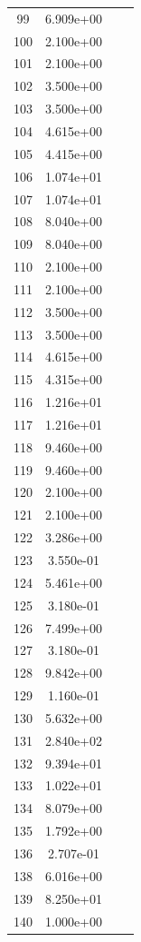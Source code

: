 \documentclass[12pt]{article}
\begin{document}
\begin{longtable}{@{}cccc@{}}
99 & 6.909e+00 &  &  \\
100 & 2.100e+00 &  &  \\
101 & 2.100e+00 &  &  \\
102 & 3.500e+00 &  &  \\
103 & 3.500e+00 &  &  \\
104 & 4.615e+00 &  &  \\
105 & 4.415e+00 &  &  \\
106 & 1.074e+01 &  &  \\
107 & 1.074e+01 &  &  \\
108 & 8.040e+00 &  &  \\
109 & 8.040e+00 &  &  \\
110 & 2.100e+00 &  &  \\
111 & 2.100e+00 &  &  \\
112 & 3.500e+00 &  &  \\
113 & 3.500e+00 &  &  \\
114 & 4.615e+00 &  &  \\
115 & 4.315e+00 &  &  \\
116 & 1.216e+01 &  &  \\
117 & 1.216e+01 &  &  \\
118 & 9.460e+00 &  &  \\
119 & 9.460e+00 &  &  \\
120 & 2.100e+00 &  &  \\
121 & 2.100e+00 &  &  \\
122 & 3.286e+00 &  &  \\
123 & 3.550e-01 &  &  \\
124 & 5.461e+00 &  &  \\
125 & 3.180e-01 &  &  \\
126 & 7.499e+00 &  &  \\
127 & 3.180e-01 &  &  \\
128 & 9.842e+00 &  &  \\
129 & 1.160e-01 &  &  \\
130 & 5.632e+00 &  &  \\
131 & 2.840e+02 &  &  \\
132 & 9.394e+01 &  &  \\
133 & 1.022e+01 &  &  \\
134 & 8.079e+00 &  &  \\
135 & 1.792e+00 &  &  \\
136 & 2.707e-01 &  &  \\
138 & 6.016e+00 &  &  \\
139 & 8.250e+01 &  &  \\
140 & 1.000e+00 &  &  \\

\end{longtable}
\end{document}
